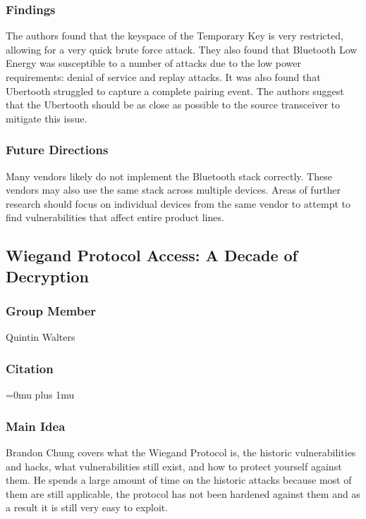 \subsubsection{Findings}

\noindent
The authors found that the keyspace of the Temporary Key is very restricted, allowing for a very quick brute force attack. They also found that Bluetooth Low Energy was susceptible to a number of attacks due to the low power requirements: denial of service and replay attacks. It was also found that Ubertooth struggled to capture a complete pairing event. The authors suggest that the Ubertooth should be as close as possible to the source transceiver to mitigate this issue. 

\subsubsection{Future Directions}

\noindent
Many vendors likely do not implement the Bluetooth stack correctly. These vendors may also use the same stack across multiple devices. Areas of further research should focus on individual devices from the same vendor to attempt to find vulnerabilities that affect entire product lines. 

\noindent
\subsection{{W}iegand {P}rotocol {A}ccess: {A} {D}ecade of {D}ecryption}

\subsubsection{Group Member}

\noindent
Quintin Walters

\noindent
\subsubsection{Citation}

\Urlmuskip=0mu plus 1mu\relax

\subsubsection{Main Idea}

\noindent
Brandon Chung covers what the Wiegand Protocol is, the historic vulnerabilities and hacks, what vulnerabilities still exist, and how to protect yourself against them.  He spends a large amount of time on the historic attacks because most of them are still applicable, the protocol has not been hardened against them and as a result it is still very easy to exploit.

